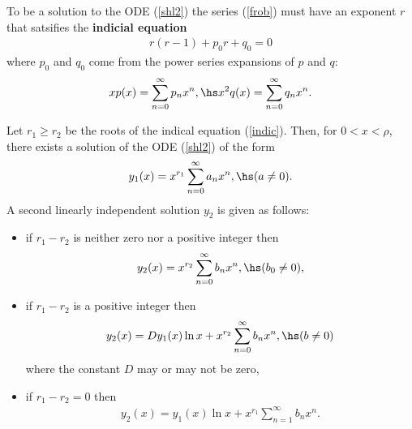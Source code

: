 \documentclass{article}
\begin{document}
\begin{theorem}
    To be a solution to the ODE (\ref{shl2}) the series (\ref{frob}) must
    have an exponent $r$ that satsifies the \textbf{indicial equation}
    \begin{align}
        \label{indic}
        r(r-1) + p_0r + q_0 = 0
    \end{align}
    where $p_0$ and $q_0$ come from the power series expansions of $p$
    and $q$:
    \begin{align*}
        xp(x) = \sum_{n=0}^\infty p_n x^n,\hs x^2q(x)=\sum_{n=0}^\infty q_nx^n.
    \end{align*}
\end{theorem}

\begin{theorem}
    Let $r_1\geq r_2$ be the roots of the indical equation (\ref{indic}).
    Then, for $0<x<\rho$, there exists a solution of the ODE (\ref{shl2}) of the
    form
    \begin{align*}
        y_1(x)=x^{r_1} \sum_{n=0}^\infty a_nx^n,\hs(a\not=0).
    \end{align*}
    A second linearly independent solution $y_2$ is given as follows:
    \begin{itemize}
        \item if $r_1-r_2$ is neither zero nor a positive integer then \begin{align*}
                  y_2(x) = x^{r_2}\sum_{n=0}^\infty b_nx^n,\hs(b_0\not=0),
              \end{align*}
        \item if $r_1-r_2$ is a positive integer then \begin{align*}
                  y_2(x) = Dy_1(x)\ln x + x^{r_2}\sum_{n=0}^\infty b_nx^n,\hs(b\not=0)
              \end{align*}
              where the constant $D$ may or may not be zero,
        \item if $r_1-r_2=0$ then \begin{align*}
                  y_2(x) = y_1(x)\ln x + x^{r_1}\sum_{n=1}^\infty b_nx^n.
              \end{align*}
    \end{itemize}
\end{theorem}
\end{document}
